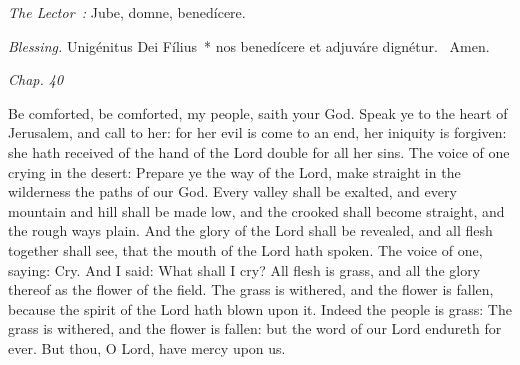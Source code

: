 {  {
    \medskip

    \emph{The Lector~:} Jube, domne, benedícere.

    \emph{Blessing.} Unigénitus Dei Fílius~* nos benedícere et adjuváre dignétur. \Rbar{}~Amen.
  }

  \bigskip
  {
    \hspace{10ex}{Lesson II.}\hfill\emph{Chap. 40}\hspace{10ex}

    \begin{parcolumns}[rulebetween,colwidths={1=.51\linewidth}]{2}
    {Be comforted, be comforted, my people, saith your God.
      Speak ye to the heart of Jerusalem, and call to her: for her evil is come to an end, her iniquity is forgiven: she hath received of the hand of the Lord double for all her sins.
      The voice of one crying in the desert: Prepare ye the way of the Lord, make straight in the wilderness the paths of our God.
      Every valley shall be exalted, and every mountain and hill shall be made low, and the crooked shall become straight, and the rough ways plain.
      And the glory of the Lord shall be revealed, and all flesh together shall see, that the mouth of the Lord hath spoken.
      The voice of one, saying: Cry. And I said: What shall I cry? All flesh is grass, and all the glory thereof as the flower of the field.
      The grass is withered, and the flower is fallen, because the spirit of the Lord hath blown upon it. Indeed the people is grass:
      The grass is withered, and the flower is fallen: but the word of our Lord endureth for ever.
      But thou, O Lord, have mercy upon us.}
    \end{parcolumns}

}}
